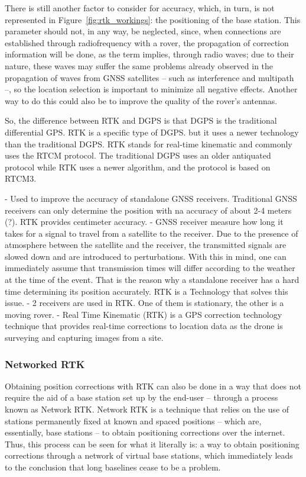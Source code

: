 There is still another factor to consider for accuracy, which, in turn, is not represented in Figure~\ref{fig:rtk_workings}: the positioning of the base station. This parameter should not, in any way, be neglected, since, when connections are established through radiofrequency with a rover, the propagation of correction information will be done, as the term implies, through radio waves; due to their nature, these waves may suffer the same problems already observed in the propagation of waves from GNSS satellites -- such as interference and multipath --, so the location selection is important to minimize all negative effects. Another way to do this could also be to improve the quality of the rover's antennas.

So, the difference between RTK and DGPS is that DGPS is the traditional differential GPS.
RTK is a specific type of DGPS.
but it uses a newer technology than the traditional DGPS.
RTK stands for real-time kinematic and commonly uses the RTCM protocol.
The traditional DGPS uses an older antiquated protocol while RTK uses a newer algorithm, and the protocol is based on RTCM3. 

- Used to improve the accuracy of standalone GNSS receivers. Traditional GNSS receivers can only determine the position with na accuracy of about 2-4 meters (?). RTK provides centimeter accuracy.
- GNSS receiver measure how long it takes for a signal to travel from a satellite to the receiver. Due to the presence of atmosphere between the satellite and the receiver, the transmitted signals are slowed down and are introduced to perturbations. With this in mind, one can immediately assume that transmission times will differ according to the weather at the time of the event. That is the reason why a standalone receiver has a hard time determining its position accurately. RTK is a Technology that solves this issue.
- 2 receivers are used in RTK. One of them is stationary, the other is a moving rover.
- Real Time Kinematic (RTK) is a GPS correction technology technique that provides real-time corrections to location data as the drone is surveying and capturing images from a site.    


\subsubsection{Networked RTK}\label{sec:II_ntrip}

Obtaining position corrections with RTK can also be done in a way that does not require the aid of a base station set up by the end-user -- through a process known as Network RTK.
Network RTK is a technique that relies on the use of stations permanently fixed at known and spaced positions -- which are, essentially, base stations -- to obtain positioning corrections over the internet. Thus, this process can be seen for what it literally is: a way to obtain positioning corrections through a network of virtual base stations, which immediately leads to the conclusion that long baselines cease to be a problem.


